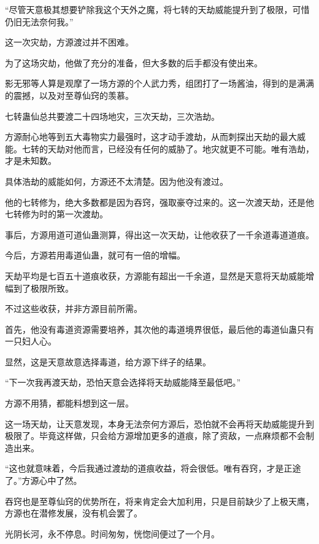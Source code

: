 
\begin{this_body}



“尽管天意极其想要铲除我这个天外之魔，将七转的天劫威能提升到了极限，可惜仍旧无法奈何我。”

这一次灾劫，方源渡过并不困难。

为了这场灾劫，他做了充分的准备，但大多数的后手都没有使出来。

影无邪等人算是观摩了一场方源的个人武力秀，组团打了一场酱油，得到的是满满的震撼，以及对至尊仙窍的羡慕。

七转蛊仙总共要渡二十四场地灾，三次天劫，三次浩劫。

方源耐心地等到五大毒物实力最强时，这才动手渡劫，从而刺探出天劫的最大威能。七转的天劫对他而言，已经没有任何的威胁了。地灾就更不可能。唯有浩劫，才是未知数。

具体浩劫的威能如何，方源还不太清楚。因为他没有渡过。

他的七转修为，绝大多数都是因为吞窍，强取豪夺过来的。这一次渡天劫，还是他七转修为时的第一次渡劫。

事后，方源用道可道仙蛊测算，得出这一次天劫，让他收获了一千余道毒道道痕。

今后，方源若用毒道仙蛊，就可有一倍的增幅。

天劫平均是七百五十道痕收获，方源能有超出一千余道，显然是天意将天劫威能增幅到了极限所致。

不过这些收获，并非方源目前所需。

首先，他没有毒道资源需要培养，其次他的毒道境界很低，最后他的毒道仙蛊只有一只妇人心。

显然，这是天意故意选择毒道，给方源下绊子的结果。

“下一次我再渡天劫，恐怕天意会选择将天劫威能降至最低吧。”

方源不用猜，都能料想到这一层。

这一场天劫，让天意发现，本身无法奈何方源后，恐怕就不会再将天劫威能提升到极限了。毕竟这样做，只会给方源增加更多的道痕，除了资敌，一点麻烦都不会制造出来。

“这也就意味着，今后我通过渡劫的道痕收益，将会很低。唯有吞窍，才是正途了。”方源心中了然。

吞窍也是至尊仙窍的优势所在，将来肯定会大加利用，只是目前缺少了上极天鹰，方源也在潜修发展，没有机会罢了。

光阴长河，永不停息。时间匆匆，恍惚间便过了一个月。


\end{this_body}
